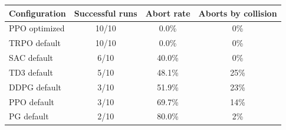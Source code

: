 \begin{tabular}{lccc}
\toprule
Configuration & Successful runs & Abort rate & Aborts by collision \\
\midrule
PPO optimized & 10/10 & 0.0\% & 0\% \\
TRPO default & 10/10 & 0.0\% & 0\% \\
SAC default & 6/10 & 40.0\% & 0\% \\
TD3 default & 5/10 & 48.1\% & 25\% \\
DDPG default & 3/10 & 51.9\% & 23\% \\
PPO default & 3/10 & 69.7\% & 14\% \\
PG default & 2/10 & 80.0\% & 2\% \\
\bottomrule
\end{tabular}
